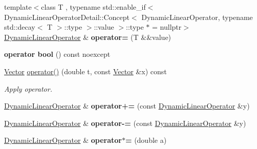 \begin{DoxyCompactItemize}
\item 
\hypertarget{classSpacy_1_1DynamicLinearOperator_ab3bf64c6af574e7bbf76ce1565c978b4}{{\footnotesize template$<$class T , typename std\-::enable\-\_\-if$<$ Dynamic\-Linear\-Operator\-Detail\-::\-Concept$<$ Dynamic\-Linear\-Operator, typename std\-::decay$<$ T $>$\-::type $>$\-::value $>$\-::type $\ast$  = nullptr$>$ }\\\hyperlink{classSpacy_1_1DynamicLinearOperator}{\-Dynamic\-Linear\-Operator} \& {\bfseries operator=} (\-T \&\&value)}\label{classSpacy_1_1DynamicLinearOperator_ab3bf64c6af574e7bbf76ce1565c978b4}

\item 
\hypertarget{classSpacy_1_1DynamicLinearOperator_a8e59ff2dc6fa7f91c461c1af20bb81fb}{{\bfseries operator bool} () const noexcept}\label{classSpacy_1_1DynamicLinearOperator_a8e59ff2dc6fa7f91c461c1af20bb81fb}

\item 
\hypertarget{classSpacy_1_1DynamicLinearOperator_a436759e2a2a59d57127e317d6b809349}{\hyperlink{classSpacy_1_1Vector}{\-Vector} \hyperlink{classSpacy_1_1DynamicLinearOperator_a436759e2a2a59d57127e317d6b809349}{operator()} (double t, const \hyperlink{classSpacy_1_1Vector}{\-Vector} \&x) const }\label{classSpacy_1_1DynamicLinearOperator_a436759e2a2a59d57127e317d6b809349}

\begin{DoxyCompactList}\small\item\em \-Apply operator. \end{DoxyCompactList}\item 
\hypertarget{classSpacy_1_1DynamicLinearOperator_a6696204e09787916f1dec88319fdcdb2}{\hyperlink{classSpacy_1_1DynamicLinearOperator}{\-Dynamic\-Linear\-Operator} \& {\bfseries operator+=} (const \hyperlink{classSpacy_1_1DynamicLinearOperator}{\-Dynamic\-Linear\-Operator} \&y)}\label{classSpacy_1_1DynamicLinearOperator_a6696204e09787916f1dec88319fdcdb2}

\item 
\hypertarget{classSpacy_1_1DynamicLinearOperator_a8a7283da8c551442f8e4e0372e088f41}{\hyperlink{classSpacy_1_1DynamicLinearOperator}{\-Dynamic\-Linear\-Operator} \& {\bfseries operator-\/=} (const \hyperlink{classSpacy_1_1DynamicLinearOperator}{\-Dynamic\-Linear\-Operator} \&y)}\label{classSpacy_1_1DynamicLinearOperator_a8a7283da8c551442f8e4e0372e088f41}

\item 
\hypertarget{classSpacy_1_1DynamicLinearOperator_ae8fc6f0856bc0218b53a7371cf2928f4}{\hyperlink{classSpacy_1_1DynamicLinearOperator}{\-Dynamic\-Linear\-Operator} \& {\bfseries operator$\ast$=} (double a)}\label{classSpacy_1_1DynamicLinearOperator_ae8fc6f0856bc0218b53a7371cf2928f4}


\end{DoxyCompactItemize}
